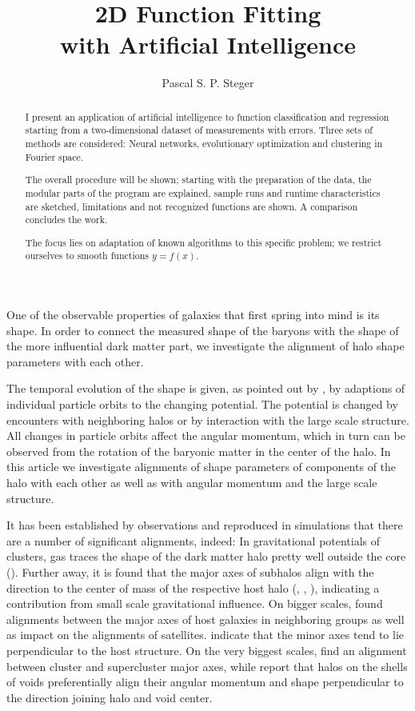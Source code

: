 \documentclass[a4paper,10pt]{paper}
\title{2D Function Fitting\\with Artificial Intelligence}
\author{Pascal S. P. Steger}
\begin{document}
\maketitle

\begin{abstract}
I present an application of artificial intelligence to function
classification and regression starting from a two-dimensional dataset
of measurements with errors. Three sets of methods are considered:
Neural networks, evolutionary optimization and clustering in Fourier space.

The overall procedure will be shown; starting with the preparation of
the data, the modular parts of the program are explained, sample runs and
runtime characteristics are sketched, limitations and not recognized
functions are shown. A comparison concludes the work.

The focus lies on adaptation of known algorithms to this specific
problem; we restrict ourselves to smooth functions $y=f(x)$.
\end{abstract}

One of the observable properties of galaxies that first spring into mind is
its shape. In order to connect the measured shape of the baryons with the
shape of the more influential dark matter part, we investigate the alignment
of halo shape parameters with each other.

The temporal evolution of the shape is given, as pointed out by
\cite{Valluri2010}, by adaptions of individual particle orbits to the changing
potential. The potential is changed by encounters with neighboring halos or by
interaction with the large scale structure. All changes in particle orbits
affect the angular momentum, which in turn can be observed from the rotation
of the baryonic matter in the center of the halo. In this article we
investigate alignments of shape parameters of components of the halo with each
other as well as with angular momentum and the large scale structure.

It has been established by observations and reproduced in simulations that
there are a number of significant alignments, indeed: In gravitational
potentials of clusters, gas traces the shape of the dark matter halo pretty
well outside the core (\cite{Lau2010}). Further away, it is found that the
major axes of subhalos align with the direction to the center of mass of the
respective host halo (\cite{Yang2006}, \cite{Faltenbacher2007},
\cite{Faltenbacher2008}), indicating a contribution from small scale
gravitational influence. On bigger scales, \cite{Wang2008} found alignments
between the major axes of host galaxies in neighboring groups as well as
impact on the alignments of satellites. \cite{Aragon-Calvo2007} indicate that
the minor axes tend to lie perpendicular to the host structure. On the very
biggest scales, \cite{Basilakos2006} find an alignment between cluster and
supercluster major axes, while \cite{Cuesta2008} report that halos on the
shells of voids preferentially align their angular momentum and shape
perpendicular to the direction joining halo and void center.
\end{document}
